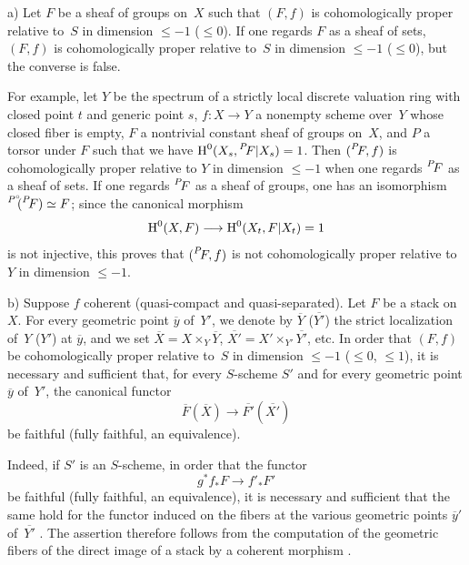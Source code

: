 \begin{remarks}
\label{XIII.1.5}
a) Let $F$ be a sheaf of groups on~$X$ such that $(F,f)$ is
cohomologically proper relative to~$S$ in dimension
$\leqslant -1$ (\resp $\leqslant 0$). If one regards $F$ as a
sheaf of sets, $(F,f)$ is cohomologically proper
relative to~$S$ in dimension $\leqslant -1$ (\resp $\leqslant
0$), but the converse is false.

For example, let $Y$ be the spectrum of a strictly local discrete
valuation ring with closed point $t$ and generic point
$s$, $f \colon X \to Y$ a nonempty scheme over~$Y$ whose closed
fiber is empty, $F$ a nontrivial constant sheaf of groups
on~$X$, and $P$ a torsor under $F$ such that we have $\H^0(X_s,
\leftexp{P\mkern-4mu}{F}|X_s)=1$. Then $(\leftexp{P\mkern-4mu}{F},f)$ is
cohomologically proper relative to $Y$ in dimension
$\leqslant -1$ when one regards $\leftexp{P\mkern-4mu}{F}$ as a
sheaf of sets. If one regards $\leftexp{P\mkern-4mu}{F}$ as a sheaf
of groups, one has an isomorphism ${\vphantom{F}}^{P^\circ\mkern-7mu}(\leftexp{P\mkern-4mu}{F})
\simeq F$; since the canonical morphism
$$
\H^0(X,F)\to\H^0(X_t,F|X_t)=1
$$
is not injective, this proves that $(\leftexp{P\mkern-4mu}{F},f)$ is not
cohomologically proper relative to $Y$ in dimension
$\leqslant -1$.


b) Suppose $f$ coherent (\ie quasi-compact and
quasi-separated). Let $F$ be a stack on~$X$. For every
geometric point $\overline{y}$ of~$Y'$, we denote by $\overline{Y}$
(\resp $\overline{Y'}$) the strict localization of~$Y$ (\resp $Y'$) at
$\overline{y}$, and we set $\overline{X} = X \times_Y \overline{Y}$,
$\overline{X'} = X' \times_{Y'} \overline{Y'}$, etc. In order that $(F,f)$
be cohomologically proper relative to~$S$ in dimension
$\leqslant -1$ (\resp $\leqslant 0$, \resp $\leqslant 1$), it is necessary and
sufficient that, for every $S$-scheme $S'$ and for every geometric
point $\overline{y}$ of~$Y'$, the canonical functor
$$
\overline{F}(\overline{X})\to\overline{F'}(\overline{X'})
$$
be faithful (\resp fully faithful, \resp an
equivalence).

Indeed,
if $S'$ is an $S$-scheme, in order that the functor
$$
g^* f_* F \to f'_* F'
$$
be faithful (\resp fully faithful, \resp an
equivalence), it is necessary and sufficient that the same hold for the functor
induced on the fibers at the various geometric points
$\overline{y}'$ of~$\overline{Y'}$ \cite[III 2.1.5.9]{XIII.2}. The assertion
therefore follows from the computation of the geometric fibers of the direct
image of a stack by a coherent morphism \cite[VII 2.1.5]{XIII.2}.



\end{remarks}
